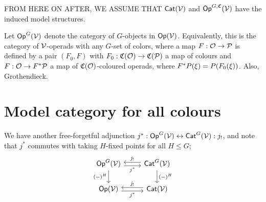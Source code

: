 \documentclass[psamsfonts,oneside,10pt,letterpaper
,draft
]{amsart}%
\renewcommand{\C}{\ensuremath{\mathfrak{C}}}
\renewcommand{\H}{\ensuremath{\mathbb{H}}}
\renewcommand{\1}{\ensuremath{\mathbb{id}}}
\renewcommand{\P}{\ensuremath{\mathcal{P}}}
\begin{document}
\begin{remark}
      {\color{red} FROM HERE ON AFTER, WE ASSUME THAT $\mathsf{Cat}(\mathcal V)$ and $\mathsf{Op}^{G,\mathfrak C}(\mathcal V)$ have the induced model structures.}
\end{remark}

\begin{definition}
      Let $\mathsf{Op}^G(\mathcal V)$ denote the category of $G$-objects in $\mathsf{Op}(\mathcal V)$.
      Equivalently, this is the category of $\mathcal V$-operads with any $G$-set of colors,
      where a map $F: \O\to \P$ is defined by a pair $(F_0,F)$ with
      $F_0: \C(\O)\to \C(\P)$ a map of colours and
      $F: \O\to F^*\P$ a map of $\C(\O)$-coloured operads, where $F^*P(\xi) = P(F_0(\xi))$.
      Also, {\color{red} Grothendieck}.
\end{definition}

\newpage

\section{Model category for all colours}

We have another free-forgetful adjunction $j^*: \mathsf{Op}^G(\mathcal V) \leftrightarrow \mathsf{Cat}^G(\mathcal V): j_!$, and note that $j^*$ commutes with taking $H$-fixed points for all $H\leq G$;
\[
      \begin{tikzcd}
            \mathsf{Op}^G(\V) \arrow[d, "(-)^H"']
            \arrow[r, shift right, "j^*"']
            &
            \mathsf{Cat}^G(\V) \arrow[l, shift right, swap, "j_!"] \arrow[d, "(-)^H"]
            \\
            \Op(\V) \arrow[r, shift right, "j^*"']
            &
            \Cat(\V) \arrow[l, shift right, swap, "j_!"]
      \end{tikzcd}
\]


\end{document}
